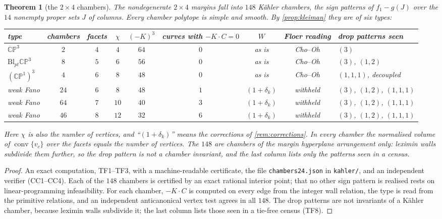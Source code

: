 \documentclass[11pt]{article}
\newtheorem{theorem}{Theorem}\newtheorem{proposition}[theorem]{Proposition}\newtheorem{lemma}[theorem]{Lemma}\newtheorem{corollary}[theorem]{Corollary}\newtheorem{conjecture}[theorem]{Conjecture}\crefname{conjecture}{Conjecture}{Conjectures}
\theoremstyle{definition}\newtheorem{definition}[theorem]{Definition}\newtheorem{remark}[theorem]{Remark}\newtheorem{example}[theorem]{Example}\newtheorem{problem}[theorem]{Open problem}\crefname{problem}{Problem}{Problems}
\begin{document}
\begin{theorem}[the $2\times4$ chambers]\label{thm:chambers24}
The nondegenerate $2\times4$ margins fall into $148$ K\"ahler chambers, the sign patterns of $f_1-g(J)$ over the $14$ nonempty proper sets $J$ of columns. Every chamber polytope is simple and smooth.
By \cref{prop:kleiman} they are of six types:
\begin{center}\footnotesize\setlength{\tabcolsep}{4pt}
\begin{tabular}{lcccccccl}\toprule
type & chambers & facets & $\chi$ & $(-K)^3$ & curves with $-K\cdot C=0$ & $W$ & Floer reading & drop patterns seen\\\midrule
$\mathbb{CP}^3$ & $2$ & $4$ & $4$ & $64$ & $0$ & as is & Cho--Oh & $(3)$\\
$\mathrm{Bl}_{pt}\mathbb{CP}^3$ & $8$ & $5$ & $6$ & $56$ & $0$ & as is & Cho--Oh & $(3)$, $(1,2)$\\
$(\mathbb{CP}^1)^3$ & $4$ & $6$ & $8$ & $48$ & $0$ & as is & Cho--Oh & $(1,1,1)$, decoupled\\
weak Fano & $24$ & $6$ & $8$ & $48$ & $1$ & $(1+\delta_k)$ & withheld & $(3)$, $(1,2)$, $(1,1,1)$\\
weak Fano & $64$ & $7$ & $10$ & $40$ & $3$ & $(1+\delta_k)$ & withheld & $(3)$, $(1,2)$, $(1,1,1)$\\
weak Fano & $46$ & $8$ & $12$ & $32$ & $6$ & $(1+\delta_k)$ & withheld & $(3)$, $(1,2)$, $(1,1,1)$\\\bottomrule
\end{tabular}
\end{center}
Here $\chi$ is also the number of vertices, and ``$(1+\delta_k)$'' means the corrections of \cref{rem:corrections}.
In every chamber the normalised volume of $\operatorname{conv}\{v_c\}$ over the facets equals the number of vertices. The $148$ are chambers of the margin hyperplane arrangement only: leximin walls
subdivide them further, so the drop pattern is not a chamber invariant, and the last column lists only the patterns seen in a census.
\end{theorem}

\begin{proof}
An exact computation, TF1--TF3, with a machine-readable certificate, the file \texttt{chambers24.json} in \texttt{kahler/}, and an independent verifier (CC1--CC4). Each of the $148$ chambers is certified by an exact rational interior point; that no other sign pattern is realised rests on linear-programming infeasibility. For each
chamber, $-K\cdot C$ is computed on every edge from the integer wall relation, the type is read from the primitive relations, and an independent anticanonical vertex test agrees in all $148$. The
drop patterns are not invariants of a K\"ahler chamber, because leximin walls subdivide it; the last column lists those seen in a tie-free census (TF8).
\end{proof}
\end{document}
